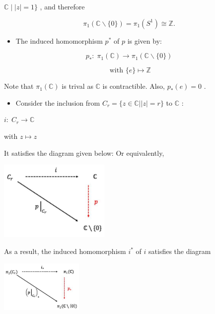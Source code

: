 \(\mathbb{C} \mid  \left| z\right|  = 1\}\) , and therefore

\[
{\pi }_{1}\left( {\mathbb{C}\smallsetminus \{ 0\} }\right)  = {\pi }_{1}\left( {S}^{1}\right)  \cong  \mathbb{Z}.
\]

\begin{itemize}
\item The induced homomorphism \({p}^{ * }\) of \(p\) is given by:
\end{itemize}

\[
{p}_{ * } : \;{\pi }_{1}\left( \mathbb{C}\right)  \rightarrow  {\pi }_{1}\left( {\mathbb{C}\smallsetminus \{ 0\} }\right)
\]

\[
\text{ with }\{ e\}  \mapsto  \mathbb{Z}
\]

Note that \({\pi }_{1}\left( \mathbb{C}\right)\) is trival as \(\mathbb{C}\) is contractible. Also, \({p}_{ * }\left( e\right)  = 0\) .

\begin{itemize}
\item Consider the inclusion from \({C}_{r} = \{ z \in  \mathbb{C}\left| \right| z \mid   = r\}\) to \(\mathbb{C}\) :
\end{itemize}

\(i : \;{C}_{r} \rightarrow  \mathbb{C}\)

with \(z \mapsto  z\)

It satisfies the diagram given below: Or equivalently,

\begin{center}
\includegraphics[max width=0.4\textwidth]{images/bo_d2bcsrref24c73avs720_140_723_324_495_359_0.jpg}
\end{center}
\hspace*{3em} 

As a result, the induced homomorphism \({i}^{ * }\) of \(i\) satisfies the diagram

\begin{center}
\includegraphics[max width=0.3\textwidth]{images/bo_d2bcsrref24c73avs720_140_723_888_453_284_0.jpg}
\end{center}
\hspace*{3em} 

